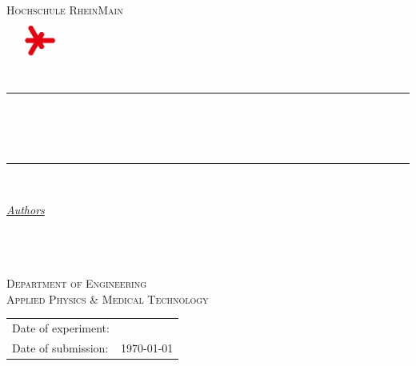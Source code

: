 \begin{titlepage} 
	\newcommand{\HRule}{\rule{\linewidth}{0.5mm}} 	
	\centering
	\textsc{\Large Hochschule RheinMain \\
		\includegraphics[width=0.15\textwidth]{logo-hsrm}\\[1cm]}
	\textsc{\LARGE \titelLV}\\[0.5cm]
		\HRule\\[0.4cm]
	{\huge\bfseries \untertitela}\\[0.4cm] %
	{\huge\bfseries \untertitelb}\\[0.4cm] %
		\HRule\\[1.5cm]
	\begin{minipage}{0.4\textwidth}
		\large
		\textit{\underline{Authors}}\\[0.5cm]
		\textsc{\nameA}\\[0.5cm]
		\textsc{\nameB}\\[0.5cm]
		\textsc{\nameC}\\[0.5cm]
\end{minipage}
\vfill\vfill\vfill 
\textsc{\Large Department of Engineering}\\[0.5cm]
\textsc{\large Applied Physics \& Medical Technology}\\[0.5cm]
\vfill
\begin{tabular}{ll}
	Date of experiment:\hspace{0.4cm} &{\large\dateLVa}\\
	Date of submission:\hspace{0.4cm} &{\large\today} 
\end{tabular}
\end{titlepage}
